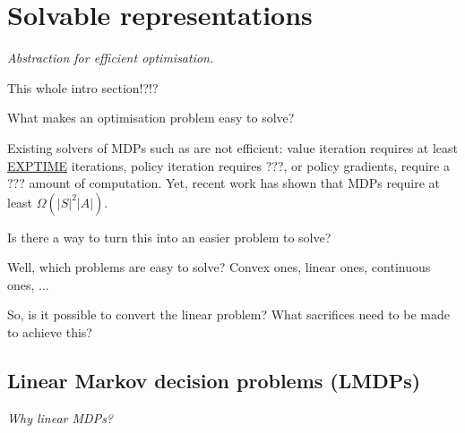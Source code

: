 \newpage
\section{Solvable representations}

\begin{displayquote}
  \textit{Abstraction for efficient optimisation.}
\end{displayquote}

{\color{red}This whole intro section!?!?}

What makes an optimisation problem easy to solve?

Existing solvers of MDPs such as are not efficient: value iteration requires at
least \href{https://en.wikipedia.org/wiki/EXPTIME}{EXPTIME} iterations,
policy iteration requires ???, or policy gradients,
require a ??? amount of computation.
Yet, recent work \cite{} has shown that MDPs require at least $\Omega(|S|^2|A|).$

Is there a way to turn this into an easier problem to solve?


Well, which problems are easy to solve? Convex ones, linear ones, continuous ones, ... \cite{ODonoghue2012a}

So, is it possible to convert the
 linear problem? What sacrifices need to be made to
achieve this?

\subsection{Linear Markov decision problems (LMDPs)}

\begin{displayquote}
\textit{Why linear MDPs?}
\end{displayquote}


%

